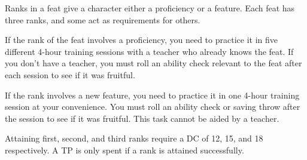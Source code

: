 Ranks in a feat give a character either a proficiency or a feature.
Each feat has three ranks, and some act as requirements for others.



If the rank of the feat involves a proficiency, you need to practice it in five different 4-hour training sessions with a teacher who already knows the feat.
If you don't have a teacher, you must roll an ability check relevant to the feat after each session to see if it was fruitful.

If the rank involves a new feature, you need to practice it in one 4-hour training session at your convenience.
You must roll an ability check or saving throw after the session to see if it was fruitful.
This task cannot be aided by a teacher.

Attaining first, second, and third ranks require a DC of 12, 15, and 18 respectively.
A TP is only spent if a rank is attained successfully.

